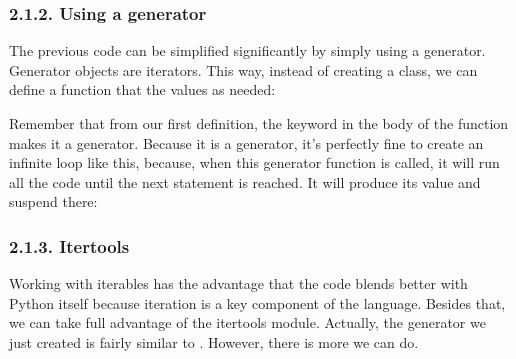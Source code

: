 \documentclass[a4paper,10pt,english]{sphinxmanual}
\begin{document}
\subsubsection{2.1.2. Using a generator}
\label{\detokenize{chapters/7_generators/index:using-a-generator}}
The previous code can be simplified significantly by simply using a generator. Generator
objects are iterators. This way, instead of creating a class, we can define a function that
 the values as needed:

\begin{sphinxVerbatim}[commandchars=\\\{\}]
 
     
         
          
\end{sphinxVerbatim}

Remember that from our first definition, the  keyword in the body of the function
makes it a generator. Because it is a generator, it’s perfectly fine to create an infinite loop
like this, because, when this generator function is called, it will run all the code until the
next  statement is reached. It will produce its value and suspend there:

\begin{sphinxVerbatim}[commandchars=\\\{\}]
  
 
\end{sphinxVerbatim}


\subsubsection{2.1.3. Itertools}
\label{\detokenize{chapters/7_generators/index:itertools}}
Working with iterables has the advantage that the code blends better with Python itself
because iteration is a key component of the language. Besides that, we can take full
advantage of the itertools module. Actually, the  generator we
just created is fairly similar to . However, there is more we can do.
\end{document}
